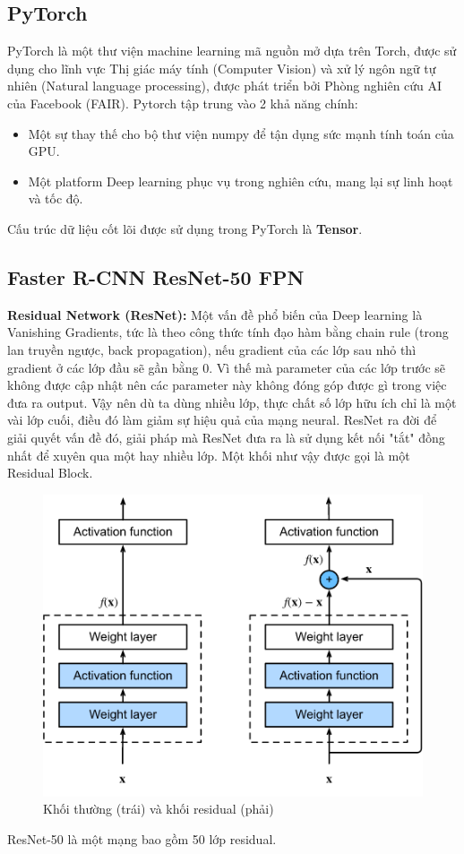 \documentclass[a4paper, 12pt]{report}
\begin{document}
\subsection{PyTorch}
PyTorch là một thư viện machine learning mã nguồn mở dựa trên Torch, được sử dụng cho lĩnh vực Thị giác máy tính (Computer Vision) và xử lý ngôn ngữ tự nhiên (Natural language processing), được phát triển bởi Phòng nghiên cứu AI của Facebook (FAIR). Pytorch tập trung vào 2 khả năng chính:
\begin{itemize}
	\item Một sự thay thế cho bộ thư viện numpy để tận dụng sức mạnh tính toán của GPU.
	\item Một platform Deep learning phục vụ trong nghiên cứu, mang lại sự linh hoạt và tốc độ.
\end{itemize}
Cấu trúc dữ liệu cốt lõi được sử dụng trong PyTorch là \textbf{Tensor}.\par
\subsection{Faster R-CNN ResNet-50 FPN}

\textbf{Residual Network (ResNet):} Một vấn đề phổ biến của Deep learning là Vanishing Gradients, tức là theo công thức tính đạo hàm bằng chain rule (trong lan truyền ngược, back propagation), nếu gradient của các lớp sau nhỏ thì gradient ở các lớp đầu sẽ gần bằng 0. Vì thế mà parameter của các lớp trước sẽ không được cập nhật nên các parameter này không đóng góp được gì trong việc đưa ra output. Vậy nên dù ta dùng nhiều lớp, thực chất số lớp hữu ích chỉ là một vài lớp cuối, điều đó làm giảm sự hiệu quả của mạng neural. ResNet ra đời để giải quyết vấn đề đó, giải pháp mà ResNet đưa ra là sử dụng kết nối "tắt" đồng nhất để xuyên qua một hay nhiều lớp. Một khối như vậy được gọi là một Residual Block.\par
\begin{figure}[!h]
	\centering
	\includegraphics[width=0.5\linewidth]{Images/resnet_1}
	\caption{Khối thường (trái) và khối residual (phải)}
	\label{fig:resnet-1}
\end{figure}
ResNet-50 là một mạng bao gồm 50 lớp residual.\par
\end{document}
